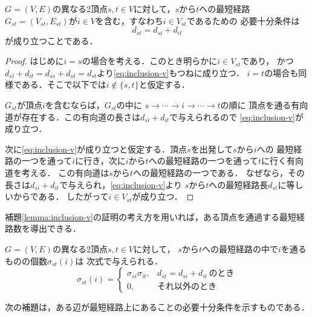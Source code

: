 \begin{lemma}
  \label{lemma:inclusion-v}
  $G=(V,E)$の異なる2頂点$s,t \in V$に対して，$s$から$t$への最短経路
  $G_{st}=(V_{st},E_{st})$が$i \in V$を含む，すなわち$i \in V_{st}$であるための
  必要十分条件は
  \begin{equation}
    d_{st}=d_{si}+d_{it}
    \label{eq:inclusion-v}
  \end{equation}
  が成り立つことである．
\end{lemma}
\begin{proof}
  はじめに$i=s$の場合を考える．このとき明らかに$i \in V_{st}$であり，
  かつ$d_{si}+d_{it}=d_{ss}+d_{st}=d_{st}$より\eqref{eq:inclusion-v}もつねに成り立つ．
  $i=t$の場合も同様である．そこで以下では$i \not\in \{s,t\}$と仮定する．

  $G_{st}$が頂点$i$を含むならば，$G_{st}$の中に
  $s \rightarrow \cdots \rightarrow i \rightarrow \cdots \rightarrow t$の順に
  頂点を通る有向道が存在する．この有向道の長さは$d_{si}+d_{it}$で与えられるので
  \eqref{eq:inclusion-v}が成り立つ．

  次に\eqref{eq:inclusion-v}が成り立つと仮定する．頂点$s$を出発して$s$から$i$への
  最短経路の一つを通って$i$に行き，次に$i$から$t$への最短経路の一つを通って$t$に行く有向道を考える．
  この有向道は$s$から$t$への最短経路の一つである．
  なぜなら，その長さは$d_{si}+d_{it}$で与えられ，\eqref{eq:inclusion-v}より
  $s$から$t$への最短経路長$d_{st}$に等しいからである．
  したがって$i \in V_{st}$が成り立つ．
\end{proof}

補題\ref{lemma:inclusion-v}の証明の考え方を用いれば，ある頂点を通過する最短経路数を導出できる．

\begin{lemma-without-proof}
  $G=(V,E)$の異なる2頂点$s,t \in V$に対して，
  $s$から$t$への最短経路の中で$i$を通るものの個数$\sigma_{st}(i)$は
  次式で与えられる．
  \begin{equation}
    \sigma_{st}(i)=
    \begin{cases}
      \sigma_{si} \sigma_{it}, & d_{st}=d_{si}+d_{it}\,\text{のとき} \\
      0, & \text{それ以外のとき}
    \end{cases}
  \end{equation}
\end{lemma-without-proof}

次の補題は，ある辺が最短経路上にあることの必要十分条件を示すものである．

